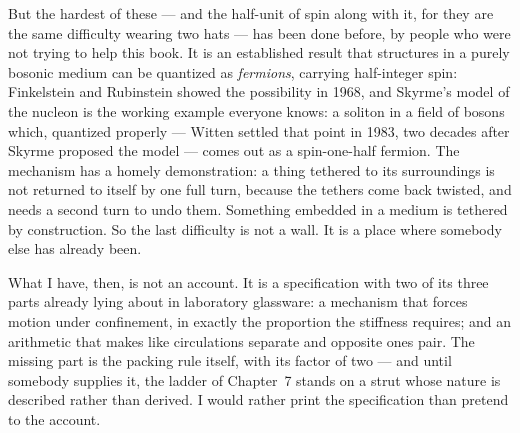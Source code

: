But the hardest of these --- and the half-unit of spin along with it, for they are the same difficulty wearing two hats --- has been done before, by people who were not trying to help this book. It is an established result that structures in a purely bosonic medium can be quantized as \emph{fermions}, carrying half-integer spin: Finkelstein and Rubinstein showed the possibility in 1968, and Skyrme's model of the nucleon is the working example everyone knows: a soliton in a field of bosons which, quantized properly --- Witten settled that point in 1983, two decades after Skyrme proposed the model --- comes out as a spin-one-half fermion. The mechanism has a homely demonstration: a thing tethered to its surroundings is not returned to itself by one full turn, because the tethers come back twisted, and needs a second turn to undo them. Something embedded in a medium is tethered by construction. So the last difficulty is not a wall. It is a place where somebody else has already been.

What I have, then, is not an account. It is a specification with two of its three parts already lying about in laboratory glassware: a mechanism that forces motion under confinement, in exactly the proportion the stiffness requires; and an arithmetic that makes like circulations separate and opposite ones pair. The missing part is the packing rule itself, with its factor of two --- and until somebody supplies it, the ladder of Chapter~7 stands on a strut whose nature is described rather than derived. I would rather print the specification than pretend to the account.


